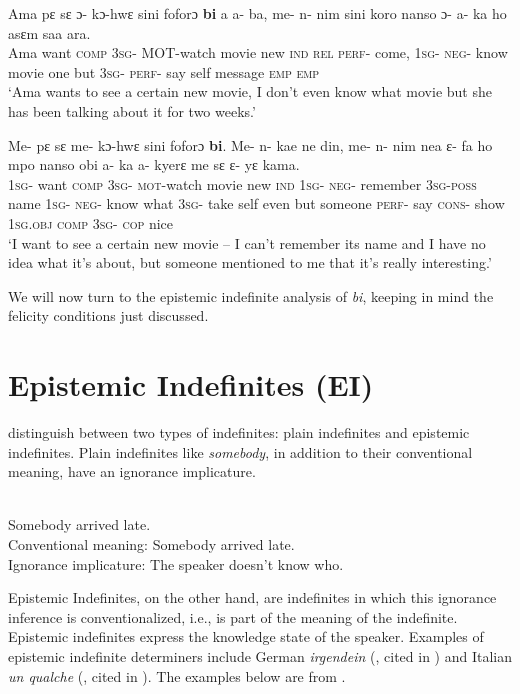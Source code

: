 \documentclass[output=paper,modfonts,nonflat,draftmode]{langsci/langscibook}
\begin{document}
\ex\label{owusu:ex21}
 \gll Ama pε sε ɔ- kɔ-hwε sini foforɔ \textbf{bi} a a- ba, me- n- nim sini koro nanso ɔ- a- ka ho asεm saa ara.\\
Ama want \textsc{comp} \textsc{3sg}- \textsc{MOT}-watch movie new \textsc{ind} \textsc{rel} \textsc{perf}- come, \textsc{1sg}- \textsc{neg}- know movie one but \textsc{3sg}- \textsc{perf}- say self message \textsc{emp} \textsc{emp} \\
\glt `Ama wants to see a certain new movie, I don't even know what movie but she has been talking about it for two weeks.'

\ex\label{owusu:ex20a}
\gll Me- pε sε me- kɔ-hwε sini foforɔ \textbf{bi}. Me- n- kae ne din, me- n- nim nea ε- fa ho mpo nanso obi a- ka a- kyerε me sε ε- yε kama.\\
\textsc{1sg}- want \textsc{comp} \textsc{3sg}- \textsc{mot}-watch movie new \textsc{ind} \textsc{1sg}- \textsc{neg}- remember \textsc{3sg}-\textsc{poss} name \textsc{1sg}- \textsc{neg}- know what \textsc{3sg}- take self even but someone \textsc{perf}- say \textsc{cons}- show \textsc{1sg}.\textsc{obj} \textsc{comp} \textsc{3sg}- \textsc{cop} nice\\
\glt `I want to see a certain new movie – I can’t remember its name and I have no idea what it’s about, but someone mentioned to me that it’s really interesting.'
\z\z

We will now turn to the epistemic indefinite analysis of \emph{bi}, keeping in mind the felicity conditions just discussed.

\section{Epistemic Indefinites (EI)}\label{sec:owusu:3}

\citet{AloniPort2015} distinguish between two types of indefinites: plain indefinites and epistemic indefinites. Plain indefinites like \emph{somebody}, in addition to their conventional meaning, have an ignorance implicature.

\ea
\ea\label{owusu:ex25}\\
 Somebody arrived late.\\
\ea Conventional meaning: Somebody arrived late.\\
\ex Ignorance implicature: The speaker doesn't know who.
\z \z\z


Epistemic Indefinites, on the other hand, are indefinites in which this ignorance inference is conventionalized, i.e., is part of the meaning of the indefinite. Epistemic indefinites express the knowledge state of the speaker. Examples of epistemic indefinite determiners include German \emph{irgendein} (\citealt{Haspelmath1997,KratzerShimoyama2002}, cited in \citealt{AloniPort2015}) and Italian \emph{un qualche}  (\citealt{Zamparelli2007}, cited in \citealt{AloniPort2015}). The examples below are from \citet{AloniPort2015}.
\end{document}
